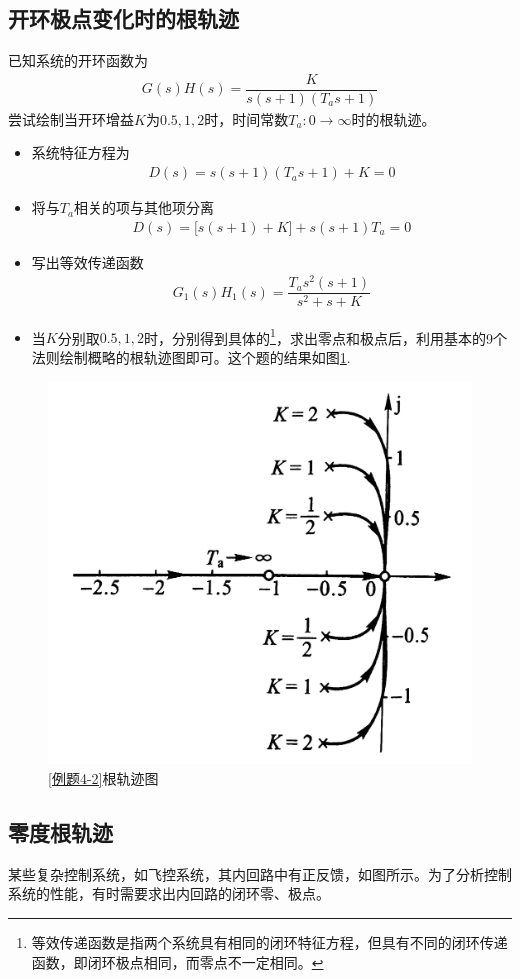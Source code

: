 \subsection{开环极点变化时的根轨迹}
\vspace*{-1em}

\examples  \label{例题4-2}已知系统的开环函数为
\begin{align}
	G(s)H(s) = \dfrac{K}{s(s+1)(T_a s + 1)}
\end{align}
尝试绘制当开环增益$K$为$0.5,1,2$时，时间常数$T_a : 0 \to \infty$时的根轨迹。
\newpage
\vspace*{-2.5em}
\solve 
\begin{itemize}
	\item 系统特征方程为
	\begin{align*}
		D(s)  = s(s+1)(T_as +1) + K = 0
	\end{align*}
	\item 将与$T_a$相关的项与其他项分离
	\begin{align*}
		D(s) = \big[s(s+1)+K\big] + s(s+1)T_a = 0
	\end{align*}
	\item 写出等效传递函数
	\begin{align*}
		G_1(s)H_1(s) = \dfrac{T_as^2(s+1)}{s^2 + s +K}
	\end{align*}
	\item 当$K$分别取$0.5,1,2$时，分别得到具体的\footnote{等效传递函数是指两个系统具有相同的闭环特征方程，但具有不同的闭环传递函数，即闭环极点相同，而零点不一定相同。}，求出零点和极点后，利用基本的9个法则绘制概略的根轨迹图即可。这个题的结果如图\ref{例题4-2根轨迹图}.
\end{itemize}
\begin{figure}[!htb]
	\centering
	\includegraphics[width=0.45\linewidth]{pic/例题4-2.png}
	\caption{\ref{例题4-2}根轨迹图}
	\label{例题4-2根轨迹图}
\end{figure}

\subsection{零度根轨迹}
某些复杂控制系统，如飞控系统，其内回路中有正反馈，如图所示。为了分析控制系统的性能，有时需要求出内回路的闭环零、极点。

